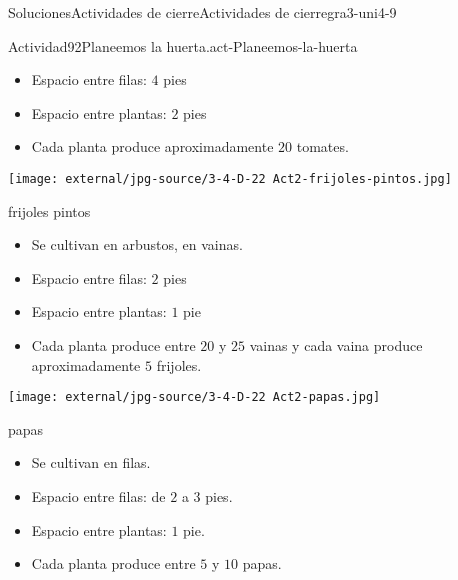 \documentclass[twoside,10pt,]{article}
\begin{document}
\begin{solutions-section}{Soluciones}{Actividades de cierre}{}{Actividades de cierre}{}{}{gra3-uni4-9}
\begin{activitysolution}{Actividad}{92}{Planeemos la huerta.}{act-Planeemos-la-huerta}
\begin{sidebyside}{2}{0}{0}{0}
\begin{sbspanel}{0.5}
\begin{itemize}[label=\textbullet]
\item{}Espacio entre filas: \(4\) pies%
\item{}Espacio entre plantas: \(2\) pies%
\item{}Cada planta produce aproximadamente \(20\) tomates.%
\end{itemize}
\end{sbspanel}%
\end{sidebyside}%
\begin{sidebyside}{2}{0}{0}{0}%
\begin{sbspanel}{0.5}%
\texttt{[image: external/jpg-source/3-4-D-22 Act2-frijoles-pintos.jpg]}
%
\par
frijoles pintos%
%
\begin{itemize}[label=\textbullet]
\item{}Se cultivan en arbustos, en vainas.%
\item{}Espacio entre filas: \(2\) pies%
\item{}Espacio entre plantas: \(1\) pie%
\item{}Cada planta produce entre \(20\) y \(25\) vainas y cada vaina produce aproximadamente \(5\) frijoles.%
\end{itemize}
\end{sbspanel}%
\begin{sbspanel}{0.5}%
\texttt{[image: external/jpg-source/3-4-D-22 Act2-papas.jpg]}
%
\par
papas%
%
\begin{itemize}[label=\textbullet]
\item{}Se cultivan en filas.%
\item{}Espacio entre filas: de \(2\) a \(3\) pies.%
\item{}Espacio entre plantas: \(1\) pie.%
\item{}Cada planta produce entre \(5\) y \(10\) papas.%
\end{itemize}
\end{sbspanel}%
\end{sidebyside}%
\end{activitysolution}%
\end{solutions-section}
%
%
\typeout{************************************************}
\typeout{************************************************}
%
\end{document}
